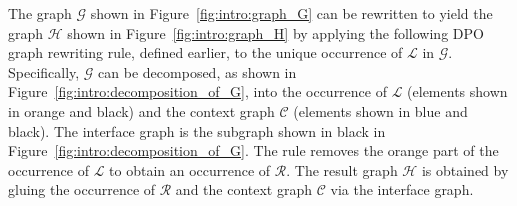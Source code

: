 \noindent The graph $\mathcal{G}$ shown in Figure~\ref{fig:intro:graph_G} can be rewritten to yield the graph $\mathcal{H}$ shown in Figure~\ref{fig:intro:graph_H} by applying the following DPO graph rewriting rule, defined earlier,
to the unique occurrence of $\mathcal{L}$ in $\mathcal{G}$.
Specifically, $\mathcal{G}$ can be decomposed, as shown in Figure~\ref{fig:intro:decomposition_of_G}, into the occurrence of $\mathcal{L}$ (elements shown in orange and black) and the context graph $\mathcal{C}$ (elements shown in blue and black). The interface graph is the subgraph shown in black in Figure~\ref{fig:intro:decomposition_of_G}. The rule removes the orange part of the occurrence of $\mathcal{L}$ to obtain an occurrence of $\mathcal{R}$. 
The result graph $\mathcal{H}$ is obtained by gluing the occurrence of $\mathcal{R}$ and the context graph $\mathcal{C}$ via the interface graph.
